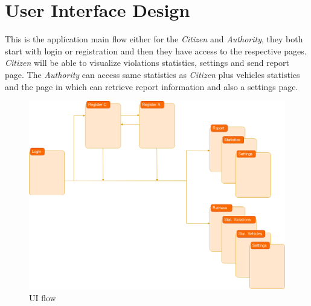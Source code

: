 \documentclass{article}
\begin{document}
\clearpage

\section{User Interface Design} 
This is the application main flow either for the \textit{Citizen} and \textit{Authority}, they both start with login 
or registration and then they have access to the respective pages. \textit{Citizen} will be able to 
visualize violations statistics, settings and send report page. The \textit{Authority} can access 
same statistics as \textit{Citizen} plus vehicles statistics and the page in which can retrieve report 
information and also a settings page.

\begin{figure}[H]
    \centering
    \includegraphics[scale=0.3]{img/UX_flow.png}
    \caption{UI flow}
\end{figure}
\end{document}
